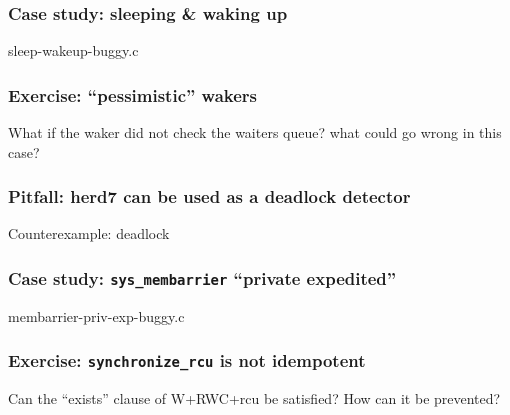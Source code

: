 \documentclass[usenames,dvipsnames]{beamer}
\begin{document}
\begin{frame}[fragile]
\frametitle{Case study: sleeping \& waking up}

\begin{center}
sleep-wakeup-buggy.c
\end{center}

\end{frame}


\begin{frame}[fragile]
\frametitle{Exercise: ``pessimistic'' wakers}

What if the waker did not check the waiters queue?  what could go wrong
in this case?

\end{frame}


\begin{frame}[fragile]
\frametitle{Pitfall: herd7 can be used as a deadlock detector}

\begin{center}
Counterexample: deadlock
\end{center}

\end{frame}


\begin{frame}[fragile]
\frametitle{Case study: \texttt{sys\_membarrier} ``private expedited''}

\begin{center}
membarrier-priv-exp-buggy.c
\end{center}

\end{frame}


\begin{frame}[fragile]
\frametitle{Exercise: \texttt{synchronize\_rcu} is not idempotent}

Can the ``exists'' clause of W+RWC+rcu be satisfied?  How can it be
prevented?

\end{frame}
\end{document}
